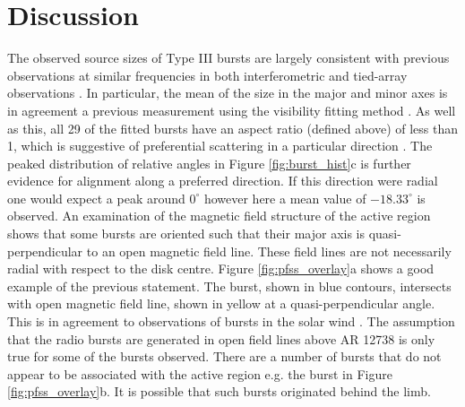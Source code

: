 
\section{Discussion}
\label{sec:obsvtheory_discussion}
The observed source sizes of Type III bursts are largely consistent with previous observations at similar frequencies in both interferometric and tied-array observations \citep{Kontar2017, Zhang2020}. In particular, the mean of the size in the major and minor axes is in agreement a previous measurement using the visibility fitting method \citep{Murphy2021}. As well as this, all 29 of the fitted bursts have an aspect ratio (defined above) of less than 1, which is suggestive of preferential scattering in a particular direction \citep{Anantharamaiah1994, Bastian1994}. The peaked distribution of relative angles in Figure \ref{fig:burst_hist}c is further evidence for alignment along a preferred direction. If this direction were radial one would expect a peak around $0^\circ$ however here a mean value of $-18.33^\circ$ is observed. An examination of the magnetic field structure of the active region shows that some bursts are oriented such that their major axis is quasi-perpendicular to an open magnetic field line. These field lines are not necessarily radial with respect to the disk centre. Figure \ref{fig:pfss_overlay}a shows a good example of the previous statement. The burst, shown in blue contours, intersects with open magnetic field line, shown in yellow at a quasi-perpendicular angle. This is in agreement to observations of bursts in the solar wind \citep{Anantharamaiah1994, SasikumarRaja2016}. The assumption that the radio bursts are generated in open field lines above AR 12738 is only true for some of the bursts observed. There are a number of bursts that do not appear to be associated with the active region e.g. the burst in Figure \ref{fig:pfss_overlay}b. It is possible that such bursts originated behind the limb. %

